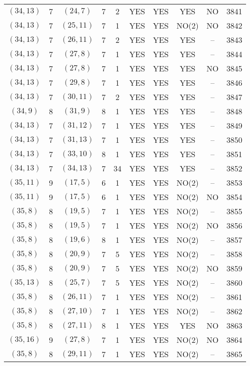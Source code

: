\begin{longtable}{|c|c|c|c|c|c|c|c|c|c|}
$(34, 13)$ & 7 & $(24, 7)$ & 7 & 2 & YES & YES & YES & NO & 3841\\
$(34, 13)$ & 7 & $(25, 11)$ & 7 & 1 & YES & YES & NO(2) & NO & 3842\\
$(34, 13)$ & 7 & $(26, 11)$ & 7 & 2 & YES & YES & YES & -- & 3843\\
$(34, 13)$ & 7 & $(27, 8)$ & 7 & 1 & YES & YES & YES & -- & 3844\\
$(34, 13)$ & 7 & $(27, 8)$ & 7 & 1 & YES & YES & YES & NO & 3845\\
$(34, 13)$ & 7 & $(29, 8)$ & 7 & 1 & YES & YES & YES & -- & 3846\\
$(34, 13)$ & 7 & $(30, 11)$ & 7 & 2 & YES & YES & YES & -- & 3847\\
$(34, 9)$ & 8 & $(31, 9)$ & 8 & 1 & YES & YES & YES & -- & 3848\\
$(34, 13)$ & 7 & $(31, 12)$ & 7 & 1 & YES & YES & YES & -- & 3849\\
$(34, 13)$ & 7 & $(31, 13)$ & 7 & 1 & YES & YES & YES & -- & 3850\\
$(34, 13)$ & 7 & $(33, 10)$ & 8 & 1 & YES & YES & YES & -- & 3851\\
$(34, 13)$ & 7 & $(34, 13)$ & 7 & 34 & YES & YES & YES & -- & 3852\\
$(35, 11)$ & 9 & $(17, 5)$ & 6 & 1 & YES & YES & NO(2) & -- & 3853\\
$(35, 11)$ & 9 & $(17, 5)$ & 6 & 1 & YES & YES & NO(2) & NO & 3854\\
$(35, 8)$ & 8 & $(19, 5)$ & 7 & 1 & YES & YES & NO(2) & -- & 3855\\
$(35, 8)$ & 8 & $(19, 5)$ & 7 & 1 & YES & YES & NO(2) & NO & 3856\\
$(35, 8)$ & 8 & $(19, 6)$ & 8 & 1 & YES & YES & NO(2) & -- & 3857\\
$(35, 8)$ & 8 & $(20, 9)$ & 7 & 5 & YES & YES & NO(2) & -- & 3858\\
$(35, 8)$ & 8 & $(20, 9)$ & 7 & 5 & YES & YES & NO(2) & NO & 3859\\
$(35, 13)$ & 8 & $(25, 7)$ & 7 & 5 & YES & YES & NO(2) & -- & 3860\\
$(35, 8)$ & 8 & $(26, 11)$ & 7 & 1 & YES & YES & NO(2) & -- & 3861\\
$(35, 8)$ & 8 & $(27, 10)$ & 7 & 1 & YES & YES & NO(2) & -- & 3862\\
$(35, 8)$ & 8 & $(27, 11)$ & 8 & 1 & YES & YES & YES & NO & 3863\\
$(35, 16)$ & 9 & $(27, 8)$ & 7 & 1 & YES & YES & NO(2) & NO & 3864\\
$(35, 8)$ & 8 & $(29, 11)$ & 7 & 1 & YES & YES & NO(2) & -- & 3865\\

\end{longtable}
